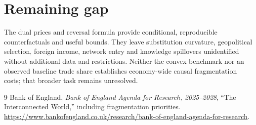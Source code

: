 \documentclass[11pt]{article}
\theoremstyle{definition}
\begin{document}
\section*{Remaining gap}
The dual prices and reversal formula provide conditional, reproducible
counterfactuals and useful bounds. They leave substitution curvature,
geopolitical selection, foreign income, network entry and knowledge spillovers
unidentified without additional data and restrictions. Neither the convex
benchmark nor an observed baseline trade share establishes economy-wide
causal fragmentation costs; that broader task remains unresolved.

\begin{thebibliography}{9}
 Bank of England, \emph{Bank of England Agenda for Research,
2025--2028}, ``The Interconnected World,'' including fragmentation priorities.
\url{https://www.bankofengland.co.uk/research/bank-of-england-agenda-for-research}.
\end{thebibliography}
\end{document}
